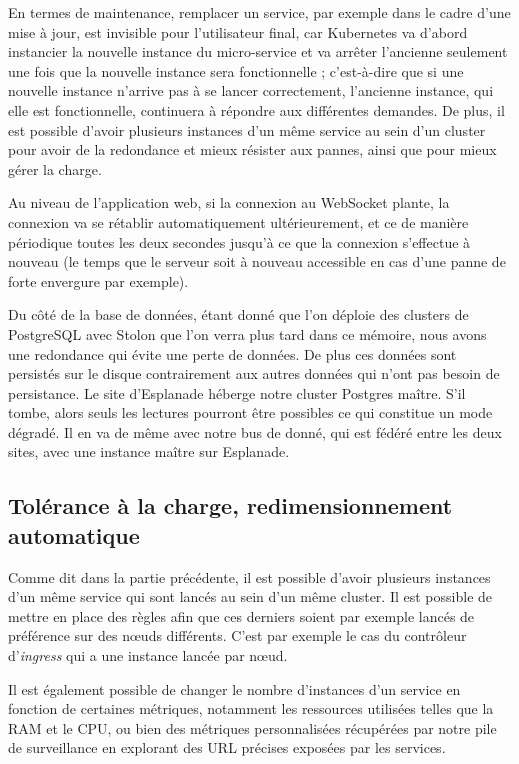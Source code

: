 En termes de maintenance, remplacer un service, par exemple dans le
cadre d'une mise à jour, est invisible pour l'utilisateur final, car
Kubernetes va d'abord instancier la nouvelle instance du micro-service
et va arrêter l'ancienne seulement une fois que la nouvelle instance
sera fonctionnelle ; c'est-à-dire que si une nouvelle instance n'arrive
pas à se lancer correctement, l'ancienne instance, qui elle est
fonctionnelle, continuera à répondre aux différentes demandes. De plus,
il est possible d'avoir plusieurs instances d'un même service au sein
d'un cluster pour avoir de la redondance et mieux résister aux pannes,
ainsi que pour mieux gérer la charge.

Au niveau de l'application web, si la connexion au WebSocket plante, la
connexion va se rétablir automatiquement ultérieurement, et ce de
manière périodique toutes les deux secondes jusqu'à ce que la connexion
s'effectue à nouveau (le temps que le serveur soit à nouveau accessible
en cas d'une panne de forte envergure par exemple).

Du côté de la base de données, étant donné que l'on déploie des clusters
de PostgreSQL avec Stolon que l'on verra plus tard dans ce mémoire, nous
avons une redondance qui évite une perte de données. De plus ces données
sont persistés sur le disque contrairement aux autres données qui n'ont
pas besoin de persistance. Le site d'Esplanade héberge notre cluster
Postgres maître. S'il tombe, alors seuls les lectures pourront être
possibles ce qui constitue un mode dégradé. Il en va de même avec notre
bus de donné, qui est fédéré entre les deux sites, avec une instance
maître sur Esplanade.

\subsection{Tolérance à la charge, redimensionnement automatique}

Comme dit dans la partie précédente, il est possible d'avoir plusieurs
instances d'un même service qui sont lancés au sein d'un même cluster.
Il est possible de mettre en place des règles afin que ces derniers
soient par exemple lancés de préférence sur des nœuds différents. C'est
par exemple le cas du contrôleur d'\textit{ingress} qui a une instance
lancée par nœud.

Il est également possible de changer le nombre d'instances d'un service
en fonction de certaines métriques, notamment les ressources utilisées
telles que la RAM et le CPU, ou bien des métriques personnalisées
récupérées par notre pile de surveillance en explorant des URL précises
exposées par les services.

